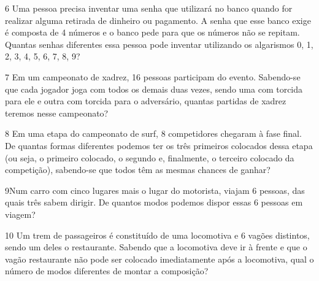 
\pagebreak
\num{6} Uma pessoa precisa inventar uma senha que utilizará no banco quando
for realizar alguma retirada de dinheiro ou pagamento. A senha que esse
banco exige é composta de 4 números e o banco pede para que os números
não se repitam. Quantas senhas diferentes essa pessoa pode inventar
utilizando os algarismos 0, 1, 2, 3, 4, 5, 6, 7, 8, 9?

\bigskip\bigskip

\num{7} Em um campeonato de xadrez, 16 pessoas participam do evento.
Sabendo-se que cada jogador joga com todos os demais duas vezes, sendo
uma com torcida para ele e outra com torcida para o adversário, quantas
partidas de xadrez teremos nesse campeonato?

\bigskip\bigskip

\num{8} Em uma etapa do campeonato de surf, 8 competidores chegaram à fase
final. De quantas formas diferentes podemos ter os três primeiros
colocados dessa etapa (ou seja, o primeiro colocado, o segundo e,
finalmente, o terceiro colocado da competição), sabendo-se que todos
têm as mesmas chances de ganhar?

\bigskip\bigskip

\num{9}Num carro com cinco lugares mais o lugar do motorista, viajam 6
pessoas, das quais três sabem dirigir. De quantos modos podemos dispor
essas 6 pessoas em viagem?

\bigskip\bigskip

\num{10} Um trem de passageiros é constituído de uma locomotiva e 6 vagões
distintos, sendo um deles o restaurante. Sabendo que a locomotiva deve ir
à frente e que o vagão restaurante não pode ser colocado imediatamente
após a locomotiva, qual o número de modos diferentes de montar a composição?


